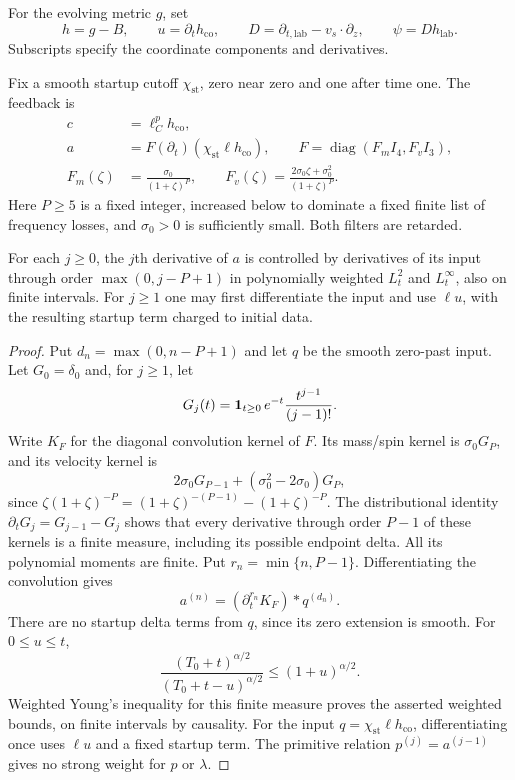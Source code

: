 For the evolving metric $g$, set
\begin{equation}\label{st:unknowns}
 h=g-B,\qquad
 u=\partial_t h_{\mathrm{co}},\qquad
 D=\partial_{t,\mathrm{lab}}-v_s\cdot\partial_z,\qquad
 \psi=D h_{\mathrm{lab}}.
\end{equation}
Subscripts specify the coordinate components and derivatives.

Fix a smooth startup cutoff $\chi_{\mathrm{st}}$, zero near
zero and one after time one.  The feedback is
\begin{equation}\label{st:feedback}
 \begin{split}
 c&=\ell_C^p h_{\mathrm{co}},\\
 a&=F(\partial_t)(\chi_{\mathrm{st}}\ell h_{\mathrm{co}}),
 \qquad
 F=\operatorname{diag}(F_m I_4,F_v I_3),\\
 F_m(\zeta)&=\frac{\sigma_0}{(1+\zeta)^P},\qquad
 F_v(\zeta)=\frac{2\sigma_0\zeta+\sigma_0^2}{(1+\zeta)^P}.
 \end{split}
\end{equation}
Here $P\geq5$ is a fixed integer, increased below to dominate
a fixed finite list of frequency losses, and $\sigma_0>0$
is sufficiently small.  Both filters are retarded.

\begin{lemma}\label{st:filter}
For each $j\geq0$, the $j$th derivative of $a$ is controlled
by derivatives of its input through order
$\max(0,j-P+1)$ in polynomially weighted $L^2_t$ and
$L^\infty_t$, also on finite intervals.  For $j\geq1$ one
may first differentiate the input and use $\ell u$, with
the resulting startup term charged to initial data.
\end{lemma}

\begin{proof}
Put $d_n=\max(0,n-P+1)$ and let $q$ be the smooth zero-past input.
Let \(G_0=\delta_0\) and, for \(j\ge1\), let
\[
 G_j(t)={\bf1}_{t\ge0}\,e^{-t}\frac{t^{j-1}}{(j-1)!}.
\]
Write \(K_F\) for the diagonal convolution kernel of \(F\). Its mass/spin kernel is \(\sigma_0G_P\), and its velocity kernel is
\[
 2\sigma_0G_{P-1}+(\sigma_0^2-2\sigma_0)G_P,
\]
since \(\zeta(1+\zeta)^{-P}=(1+\zeta)^{-(P-1)}-(1+\zeta)^{-P}\). The distributional identity
\(\partial_tG_j=G_{j-1}-G_j\) shows that every derivative through order \(P-1\) of these kernels is a finite measure, including its possible endpoint delta. All its polynomial moments are finite. Put \(r_n=\min\{n,P-1\}\). Differentiating the convolution gives
\[
 a^{(n)}=(\partial_t^{r_n}K_F)*q^{(d_n)}.
\]
There are no startup delta terms from \(q\), since its zero extension is smooth. For \(0\le u\le t\),
\[
 \frac{(T_0+t)^{\alpha/2}}{(T_0+t-u)^{\alpha/2}}
 \le (1+u)^{\alpha/2}.
\]
Weighted Young's inequality for this finite measure proves the asserted
weighted bounds, on finite intervals by causality. For the input
$q=\chi_{\mathrm{st}}\ell h_{\mathrm{co}}$, differentiating once uses
$\ell u$ and a fixed startup term. The primitive relation
$p^{(j)}=a^{(j-1)}$ gives no strong weight for $p$ or $\lambda$.
\end{proof}

